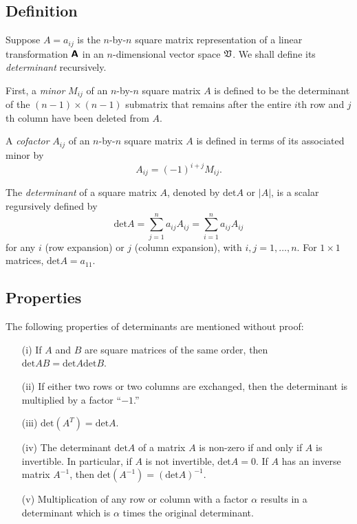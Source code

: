\subsection{Definition}

Suppose $A=a_{ij}$ is the  $n$-by-$n$ square matrix representation of
a linear transformation $\textsf{\textbf{A}}$
in an $n$-dimensional vector space ${\frak V}$.
We shall define its {\em determinant} recursively.

First,
a {\em minor}
$M_{ij}$ of an  $n$-by-$n$ square matrix  $A$ is
defined to be the determinant of the
$(n-1)\times (n-1)$ submatrix
that remains after the entire $i$th row and $j$th column have been deleted from $A$.

A {\em cofactor}
$A_{ij}$
of an $n$-by-$n$ square matrix  $A$
is defined in terms of its associated minor by
\begin{equation}
A_{ij}=(-1)^{i+j}M_{ij}.
\end{equation}

The {\em determinant} of a square matrix $A$, denoted by
$\textrm{det} A$ or $\vert A\vert$, is a scalar regursively defined by
\begin{equation}
\textrm{det}A
=\sum_{j=1}^n a_{ij}A_{ij}
=\sum_{i=1}^n a_{ij}A_{ij}
\end{equation}
for any $i$ (row expansion) or $j$ (column expansion), with $i,j=1,\ldots ,n$.
For $1\times 1$ matrices, $\textrm{det}A =a_{11}$.

\subsection{Properties}

The following properties of determinants are mentioned without proof:

\begin{itemize}
\item[(i)]
If $A$ and $B$ are square matrices of the same order, then
$\textrm{det}AB = \textrm{det}A  \textrm{det}B$.

\item[(ii)]
If either two rows or two columns are exchanged, then the determinant is multiplied
by a factor ``$-1$.''


\item[(iii)]
$\textrm{det}(A^T) = \textrm{det}A .$

\item[(iv)]
The determinant $\textrm{det}A $ of a matrix $A$ is non-zero if and only if $A$ is invertible.
In particular, if $A$ is not invertible, $\textrm{det}A =0$.
If $A$ has an inverse matrix $A^{-1}$, then $\textrm{det}(A^{-1}) = (\textrm{det}A)^{-1} $.


\item[(v)]
Multiplication of any row or column with a factor $\alpha$  results in a determinant
which is $\alpha$ times the original determinant.
\end{itemize}

